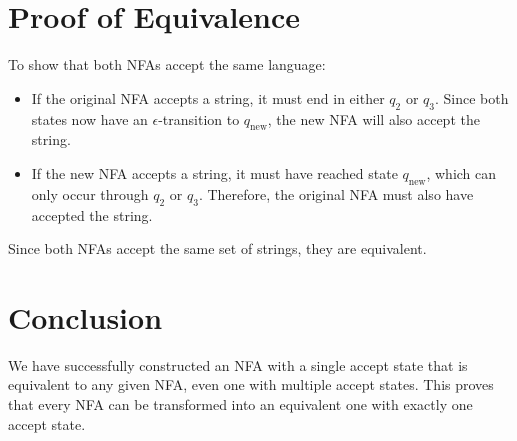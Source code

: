 \documentclass[12pt]{article}
\begin{document}
	\section{Proof of Equivalence}
	To show that both NFAs accept the same language:
	\begin{itemize}
		\item If the original NFA accepts a string, it must end in either $q_2$ or $q_3$. Since both states now have an $\epsilon$-transition to $q_{\text{new}}$, the new NFA will also accept the string.
		\item If the new NFA accepts a string, it must have reached state $q_{\text{new}}$, which can only occur through $q_2$ or $q_3$. Therefore, the original NFA must also have accepted the string.
	\end{itemize}
	Since both NFAs accept the same set of strings, they are equivalent.
	
	\section{Conclusion}
	We have successfully constructed an NFA with a single accept state that is equivalent to any given NFA, even one with multiple accept states. This proves that every NFA can be transformed into an equivalent one with exactly one accept state.
	
\end{document}
